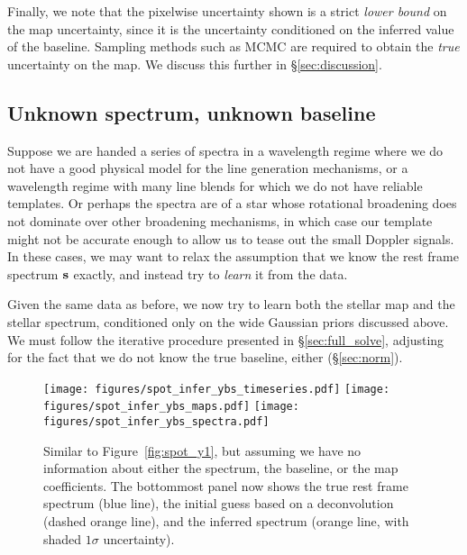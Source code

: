 \documentclass[modern]{aastex631}
\begin{document}

Finally, we note that the pixelwise uncertainty shown is a strict \emph{lower bound} on the map uncertainty, since it is the uncertainty conditioned on the inferred value of the baseline. 
Sampling methods such as MCMC are required to obtain the \emph{true} uncertainty on the map. 
We discuss this further in \S\ref{sec:discussion}.

\subsection{Unknown spectrum, unknown baseline}
\label{sec:spot_y1bs}
%
Suppose we are handed a series of spectra in a wavelength regime where we do not have a good physical model for the line generation mechanisms, or a wavelength regime with many line blends for which we do not have reliable templates. 
Or perhaps the spectra are of a star whose rotational broadening does not dominate over other broadening mechanisms, in which case our template might not be accurate enough to allow us to tease out the small Doppler signals. 
In these cases, we may want to relax the assumption that we know the rest frame spectrum ${\mathbf{s}}$ exactly, and instead try to \emph{learn} it from the data.

Given the same data as before, we now try to learn both the stellar map and the stellar spectrum, conditioned only on the wide Gaussian priors discussed above. 
We must follow the iterative procedure presented in
\S\ref{sec:full_solve}, adjusting for the fact that we do not know the true baseline, either (\S\ref{sec:norm}).

\begin{figure}[p!]
    \begin{centering}
        \texttt{[image: figures/spot\_infer\_ybs\_timeseries.pdf]}
        \texttt{[image: figures/spot\_infer\_ybs\_maps.pdf]}
        \texttt{[image: figures/spot\_infer\_ybs\_spectra.pdf]}
        \caption{%
        Similar to Figure~\ref{fig:spot_y1}, but assuming we have no information about either the spectrum, the baseline, or the map coefficients. 
        The bottommost panel now shows the true rest frame spectrum (blue line), the initial guess based on a deconvolution (dashed orange line), and the inferred spectrum (orange line, with shaded $1\sigma$ uncertainty).
        }
        \label{fig:spot_infer_ybs}
    \end{centering}
\end{figure}
\end{document}
